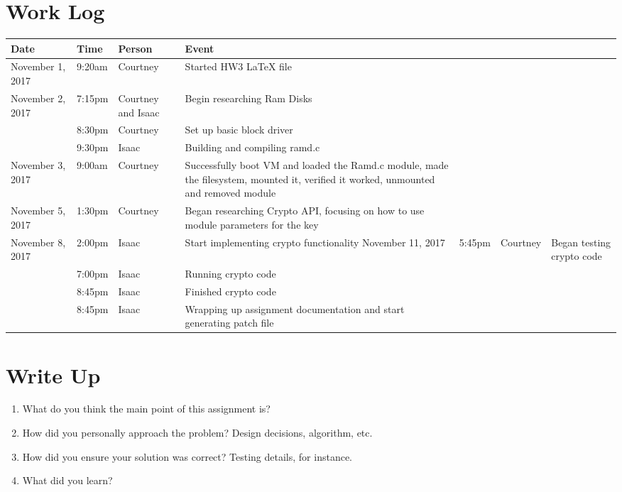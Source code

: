 \documentclass[letterpaper,10pt,draftclsnofoot,onecolumn,titlepage]{IEEEtran}
\begin{document}
\section{Work Log}
\begin{center}
\begin{tabular}{p{3cm}p{1cm}p{1cm}p{10cm} }
 Date  & Time & Person & Event \\ \hline
November 1, 2017 & 9:20am & Courtney & Started HW3 LaTeX file \\
November 2, 2017 & 7:15pm & Courtney and Isaac & Begin researching Ram Disks \\
		 & 8:30pm & Courtney & Set up basic block driver \\
		 & 9:30pm & Isaac & Building and compiling ramd.c \\
November 3, 2017 & 9:00am & Courtney & Successfully boot VM and loaded the Ramd.c module, made the filesystem, mounted it, verified it worked, unmounted and removed module \\
November 5, 2017 & 1:30pm & Courtney & Began researching Crypto API, focusing on how to use module parameters for the key \\
November 8, 2017 & 2:00pm & Isaac & Start implementing crypto functionality
November 11, 2017 & 5:45pm & Courtney & Began testing crypto code \\
		  & 7:00pm & Isaac & Running crypto code \\
   		  & 8:45pm & Isaac & Finished crypto code \\
   		  & 8:45pm & Isaac & Wrapping up assignment documentation and start generating patch file \\
\end{tabular}
\end{center}

\section{Write Up}
\begin{enumerate}
                \item What do you think the main point of this assignment is? \\
                \item How did you personally approach the problem? Design decisions, algorithm, etc. \\
                \item How did you ensure your solution was correct? Testing details, for instance.
                \item What did you learn?
\end{enumerate}
\end{document}
